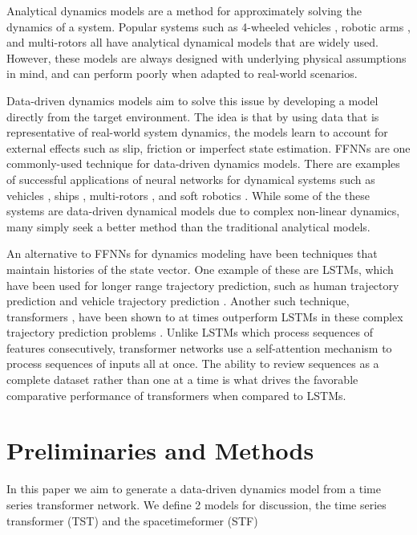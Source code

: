 \documentclass[letterpaper, 10 pt, conference]{ieeeconf}  %
\begin{document}
Analytical dynamics models are a method for approximately solving the dynamics of a system. Popular systems such as 4-wheeled vehicles \cite{bikemodel,pacejka1992magic}, robotic arms \cite{gaz2019dynamic}, and multi-rotors \cite{Heredia2014Multirotor} all have analytical dynamical models that are widely used. However, these models are always designed with underlying physical assumptions in mind, and can perform poorly when adapted to real-world scenarios.

Data-driven dynamics models aim to solve this issue by developing a model directly from the target environment. The idea is that by using data that is representative of real-world system dynamics, the models learn to account for external effects such as slip, friction or imperfect state estimation. FFNNs are one commonly-used technique for data-driven dynamics models. There are examples of successful applications of neural networks for dynamical systems such as vehicles \cite{goldfain2019autorally}, ships \cite{MOREIRA20031669Ships}, multi-rotors \cite{Bansal2016LearningQD}, and soft robotics \cite{gillespie2018softrobotics}. While some of the these systems are data-driven dynamical models due to complex non-linear dynamics, many simply seek a better method than the traditional analytical models. 

An alternative to FFNNs for dynamics modeling have been techniques that maintain histories of the state vector. One example of these are LSTMs, which have been used for longer range trajectory prediction, such as human trajectory prediction \cite{Giuliari_Tx_vs_LSTM_traj_forcasting} and vehicle trajectory prediction \cite{altche2017lstm}. Another such technique, transformers \cite{VaswaniAttentionisAll}, have been shown to at times outperform LSTMs in these complex trajectory prediction problems \cite{Giuliari_Tx_vs_LSTM_traj_forcasting,yu2020spatio}.  Unlike LSTMs which process sequences of features consecutively, transformer networks use a self-attention mechanism to process sequences of inputs all at once. The ability to review sequences as a complete dataset rather than one at a time is what drives the favorable comparative performance of transformers when compared to LSTMs.

\section{Preliminaries and Methods}\label{sec:methods}
In this paper we aim to generate a data-driven dynamics model from a time series transformer network. We define 2 models for discussion, the time series transformer (TST) and the spacetimeformer (STF) \cite{grigsby2021longrange}
\end{document}
